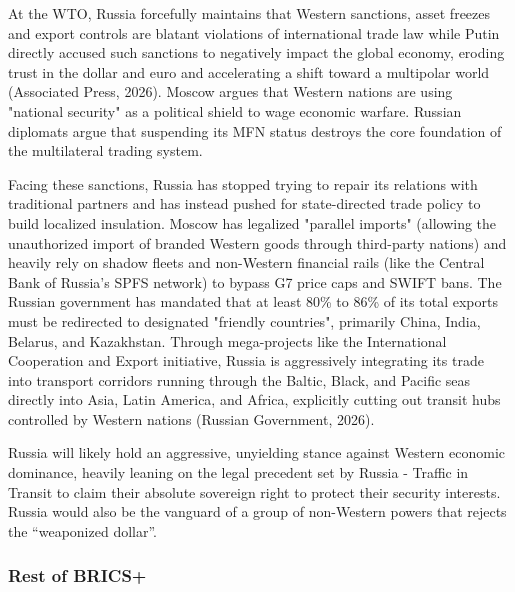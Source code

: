 At the WTO, Russia forcefully maintains that Western sanctions, asset freezes and export controls are blatant violations of international trade law while Putin directly accused such sanctions to negatively impact the global economy, eroding trust in the dollar and euro and accelerating a shift toward a multipolar world (Associated Press, 2026). Moscow argues that Western nations are using "national security" as a political shield to wage economic warfare. Russian diplomats argue that suspending its MFN status destroys the core foundation of the multilateral trading system.

Facing these sanctions, Russia has stopped trying to repair its relations with traditional partners and has instead pushed for state-directed trade policy to build localized insulation. Moscow has legalized "parallel imports" (allowing the unauthorized import of branded Western goods through third-party nations) and heavily rely on shadow fleets and non-Western financial rails (like the Central Bank of Russia's SPFS network) to bypass G7 price caps and SWIFT bans. The Russian government has mandated that at least 80\% to 86\% of its total exports must be redirected to designated "friendly countries", primarily China, India, Belarus, and Kazakhstan. Through mega-projects like the International Cooperation and Export initiative, Russia is aggressively integrating its trade into transport corridors running through the Baltic, Black, and Pacific seas directly into Asia, Latin America, and Africa, explicitly cutting out transit hubs controlled by Western nations (Russian Government, 2026).

Russia will likely hold an aggressive, unyielding stance against Western economic dominance, heavily leaning on the legal precedent set by Russia - Traffic in Transit to claim their absolute sovereign right to protect their security interests. Russia would also be the vanguard of a group of non-Western powers that rejects the “weaponized dollar”.

\subsubsection{Rest of BRICS+}

